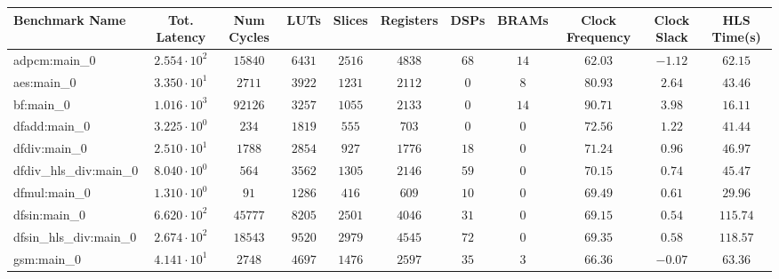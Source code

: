 \begin{tabular}{|l|c|c|c|c|c|c|c|c|c|c|}
\hline
Benchmark Name          & Tot. Latency           & Num Cycles & LUTs      & Slices    & Registers & DSPs    & BRAMs   & Clock Frequency & Clock Slack & HLS Time(s) \\
\hline
adpcm:main\_0           & $ 2.554 \cdot 10^{2} $ & $ 15840  $ & $ 6431  $ & $ 2516  $ & $ 4838  $ & $ 68  $ & $ 14  $ & $ 62.03       $ & $ -1.12   $ & $ 62.15   $ \\
aes:main\_0             & $ 3.350 \cdot 10^{1} $ & $ 2711   $ & $ 3922  $ & $ 1231  $ & $ 2112  $ & $ 0   $ & $ 8   $ & $ 80.93       $ & $ 2.64    $ & $ 43.46   $ \\
bf:main\_0              & $ 1.016 \cdot 10^{3} $ & $ 92126  $ & $ 3257  $ & $ 1055  $ & $ 2133  $ & $ 0   $ & $ 14  $ & $ 90.71       $ & $ 3.98    $ & $ 16.11   $ \\
dfadd:main\_0           & $ 3.225 \cdot 10^{0} $ & $ 234    $ & $ 1819  $ & $ 555   $ & $ 703   $ & $ 0   $ & $ 0   $ & $ 72.56       $ & $ 1.22    $ & $ 41.44   $ \\
dfdiv:main\_0           & $ 2.510 \cdot 10^{1} $ & $ 1788   $ & $ 2854  $ & $ 927   $ & $ 1776  $ & $ 18  $ & $ 0   $ & $ 71.24       $ & $ 0.96    $ & $ 46.97   $ \\
dfdiv\_hls\_div:main\_0 & $ 8.040 \cdot 10^{0} $ & $ 564    $ & $ 3562  $ & $ 1305  $ & $ 2146  $ & $ 59  $ & $ 0   $ & $ 70.15       $ & $ 0.74    $ & $ 45.47   $ \\
dfmul:main\_0           & $ 1.310 \cdot 10^{0} $ & $ 91     $ & $ 1286  $ & $ 416   $ & $ 609   $ & $ 10  $ & $ 0   $ & $ 69.49       $ & $ 0.61    $ & $ 29.96   $ \\
dfsin:main\_0           & $ 6.620 \cdot 10^{2} $ & $ 45777  $ & $ 8205  $ & $ 2501  $ & $ 4046  $ & $ 31  $ & $ 0   $ & $ 69.15       $ & $ 0.54    $ & $ 115.74  $ \\
dfsin\_hls\_div:main\_0 & $ 2.674 \cdot 10^{2} $ & $ 18543  $ & $ 9520  $ & $ 2979  $ & $ 4545  $ & $ 72  $ & $ 0   $ & $ 69.35       $ & $ 0.58    $ & $ 118.57  $ \\
gsm:main\_0             & $ 4.141 \cdot 10^{1} $ & $ 2748   $ & $ 4697  $ & $ 1476  $ & $ 2597  $ & $ 35  $ & $ 3   $ & $ 66.36       $ & $ -0.07   $ & $ 63.36   $ \\

\end{tabular}
